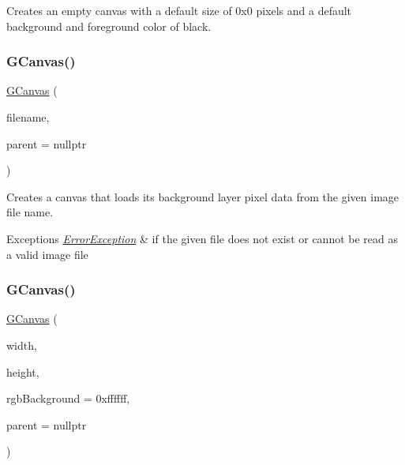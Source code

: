 Creates an empty canvas with a default size of 0x0 pixels and a default background and foreground color of black. 

\mbox{\label{classGCanvas_a0a9de139286d0fc9146928aff8f0538c}} 
\subsubsection{\texorpdfstring{G\+Canvas()}{GCanvas()}\hspace{0.1cm}{\footnotesize\ttfamily [2/4]}}
{\footnotesize\ttfamily \mbox{\hyperlink{classGCanvas}{G\+Canvas}} (\begin{DoxyParamCaption}\item[{const std\+::string \&}]{filename,  }\item[{Q\+Widget $\ast$}]{parent = {\ttfamily nullptr} }\end{DoxyParamCaption})}



Creates a canvas that loads its background layer pixel data from the given image file name. 


\begin{DoxyExceptions}{Exceptions}
{\em \mbox{\hyperlink{classErrorException}{Error\+Exception}}} & if the given file does not exist or cannot be read as a valid image file \\
\hline
\end{DoxyExceptions}
\mbox{\label{classGCanvas_a2c096b9b7c402dd90a507523c8012794}} 
\subsubsection{\texorpdfstring{G\+Canvas()}{GCanvas()}\hspace{0.1cm}{\footnotesize\ttfamily [3/4]}}
{\footnotesize\ttfamily \mbox{\hyperlink{classGCanvas}{G\+Canvas}} (\begin{DoxyParamCaption}\item[{double}]{width,  }\item[{double}]{height,  }\item[{int}]{rgb\+Background = {\ttfamily 0xffffff},  }\item[{Q\+Widget $\ast$}]{parent = {\ttfamily nullptr} }\end{DoxyParamCaption})}



